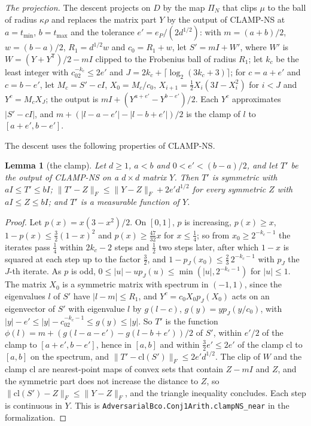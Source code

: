 \documentclass[11pt]{amsart}
\newtheorem{lemma}[theorem]{Lemma}
\theoremstyle{definition}
\numberwithin{equation}{section}
\begin{document}
\emph{The projection.} The descent projects on $D$ by the map $\Pi_N$ that clips $\mu$ to the ball of radius $\kappa\rho$ and replaces the matrix part $Y$ by the output of CLAMP-NS at $a=t_{\min}$, $b=t_{\max}$ and the tolerance $e'=e_P/(2d^{1/2})$: with $m=(a+b)/2$, $w=(b-a)/2$, $R_1=d^{1/2}w$ and $c_0=R_1+w$, let $S'=mI+W'$, where $W'$ is $W=(Y+Y^{\mathsf T})/2-mI$ clipped to the Frobenius ball of radius $R_1$; let $k_c$ be the least integer with $c_02^{-k_c}\le2e'$ and $J=2k_c+\lceil\log_2(3k_c+3)\rceil$; for $c=a+e'$ and $c=b-e'$, let $M_c=S'-cI$, $X_0=M_c/c_0$, $X_{i+1}=\frac12X_i(3I-X_i^2)$ for $i<J$ and $Y^c=M_cX_J$; the output is $mI+(Y^{a+e'}-Y^{b-e'})/2$. Each $Y^c$ approximates $|S'-cI|$, and $m+(|l-a-e'|-|l-b+e'|)/2$ is the clamp of $l$ to $[a+e',b-e']$.

The descent uses the following properties of CLAMP-NS.

\begin{lemma}[the clamp]\label{lem:ns}
Let $d\ge1$, $a<b$ and $0<e'<(b-a)/2$, and let $T'$ be the output of CLAMP-NS on a $d\times d$ matrix $Y$. Then $T'$ is symmetric with $aI\le T'\le bI$; $\|T'-Z\|_F\le\|Y-Z\|_F+2e'd^{1/2}$ for every symmetric $Z$ with $aI\le Z\le bI$; and $T'$ is a measurable function of $Y$.
\end{lemma}

\begin{proof}
Let $p(x)=x(3-x^2)/2$. On $[0,1]$, $p$ is increasing, $p(x)\ge x$, $1-p(x)\le\frac32(1-x)^2$ and $p(x)\ge\frac{47}{32}x$ for $x\le\frac14$; so from $x_0\ge2^{-k_c-1}$ the iterates pass $\frac14$ within $2k_c-2$ steps and $\frac12$ two steps later, after which $1-x$ is squared at each step up to the factor $\frac32$, and $1-p_J(x_0)\le\frac23\,2^{-k_c-1}$ with $p_J$ the $J$-th iterate. As $p$ is odd, $0\le|u|-up_J(u)\le\min(|u|,2^{-k_c-1})$ for $|u|\le1$. The matrix $X_0$ is a symmetric matrix with spectrum in $(-1,1)$, since the eigenvalues $l$ of $S'$ have $|l-m|\le R_1$, and $Y^c=c_0X_0p_J(X_0)$ acts on an eigenvector of $S'$ with eigenvalue $l$ by $g(l-c)$, $g(y)=yp_J(y/c_0)$, with $|y|-e'\le|y|-c_02^{-k_c-1}\le g(y)\le|y|$. So $T'$ is the function $\phi(l)=m+(g(l-a-e')-g(l-b+e'))/2$ of $S'$, within $e'/2$ of the clamp to $[a+e',b-e']$, hence in $[a,b]$ and within $\frac32e'\le2e'$ of the clamp $\mathrm{cl}$ to $[a,b]$ on the spectrum, and $\|T'-\mathrm{cl}(S')\|_F\le2e'd^{1/2}$. The clip of $W$ and the clamp $\mathrm{cl}$ are nearest-point maps of convex sets that contain $Z-mI$ and $Z$, and the symmetric part does not increase the distance to $Z$, so $\|\mathrm{cl}(S')-Z\|_F\le\|Y-Z\|_F$, and the triangle inequality concludes. Each step is continuous in $Y$.
This is \texttt{AdversarialBco.Conj1Arith.clampNS\_near} in the formalization.
\end{proof}
\end{document}
